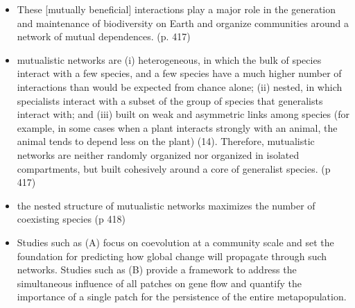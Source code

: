 \documentclass[twoside]{article}	                         %
\begin{document}
\citep{bascompte_disentangling_2009}
\begin{itemize}
  \item These [mutually beneficial] interactions play a major role in the generation and maintenance of biodiversity on Earth and organize communities around a network of mutual dependences. (p. 417)
  \item mutualistic networks are (i) heterogeneous, in which the bulk of species interact with a few species, and  a few species have a much higher number of interactions than would be expected from chance alone; (ii) nested, in which specialists interact with a subset of the group of species that generalists interact with; and (iii) built on weak and asymmetric links among species (for example, in some cases when a plant interacts strongly with an animal, the animal tends to depend less on the plant) (14). Therefore, mutualistic networks are neither randomly organized nor organized in isolated compartments, but built cohesively around a core of generalist species. (p 417)
  \item the nested structure of mutualistic networks maximizes the number of coexisting species (p 418)
  \item Studies such as (A) focus on coevolution at a community scale and set the foundation for predicting how global change will propagate through such networks. Studies such as (B) provide a framework to address the simultaneous influence of all patches on gene flow and quantify the importance of a single patch for the persistence of the entire metapopulation.
\end{itemize}




\newpage


\end{document}
